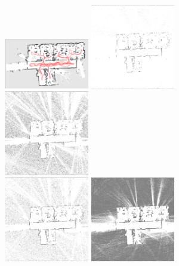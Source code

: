 \documentclass[letterpaper, 10 pt, conference]{ieeeconf} %
\begin{document}
\begin{figure}
  \includegraphics[width=0.33\textwidth]{../../Data/albertb.sm/path.png}%
  \includegraphics[width=0.33\textwidth, trim=65px 125px 20px 175px, clip]{../../Data/albertb.sm/TwoAssumptionAlgo.png}%
  \includegraphics[width=0.33\textwidth, trim=65px 125px 20px 175px, clip]{../../Data/albertb.sm/SICKSlowMetropolis.png}\\
  \includegraphics[width=0.33\textwidth, trim=65px 125px 20px 175px, clip]{../../Data/albertb.sm/SICKDDMCMC.png}%
  \includegraphics[width=0.33\textwidth, trim=65px 125px 20px 175px, clip]{../../Data/albertb.sm/run_belief_propagation.png}%

\end{figure}
\end{document}
